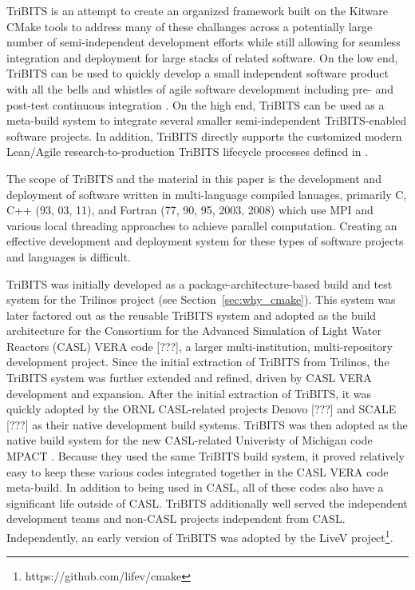 \documentclass[note]{TechNote}
\begin{document}
TriBITS is an attempt to create an organized framework built on the Kitware CMake tools to address many of these challanges across a potentially large number of semi-independent development efforts while still allowing for seamless integration and deployment for large stacks of related software.  On the low end, TriBITS can be used to quickly develop a small independent software product with all the bells and whistles of agile software development including pre- and post-test continuous integration \cite{XP2, ContinuousIntegration07}.  On the high end, TriBITS can be used as a meta-build system to integrate several smaller semi-independent TriBITS-enabled software projects.  In addition, TriBITS directly supports the customized modern Lean/Agile research-to-production TriBITS lifecycle processes defined in \cite{TribitsLifecycleModel, TribitsLifecycleModel_eScience2012}.

The scope of TriBITS and the material in this paper is the development and deployment of software written in multi-language compiled lanuages, primarily C, C++ (93, 03, 11), and Fortran (77, 90, 95, 2003, 2008) which use MPI and various local threading approaches to achieve parallel computation.  Creating an effective development and deployment system for these types of software projects and languages is difficult.

TriBITS was initially developed as a package-architecture-based build and test system for the Trilinos project (see Section~\ref{sec:why_cmake}).  This system was later factored out as the reusable TriBITS system and adopted as the build architecture for the Consortium for the Advanced Simulation of Light Water Reactors (CASL) VERA code [???], a larger multi-institution, multi-repository development project.  Since the initial extraction of TriBITS from Trilinos, the TriBITS system was further extended and refined, driven by CASL VERA development and expansion.   After the initial extraction of TriBITS, it was quickly adopted by the ORNL CASL-related projects Denovo [???] and SCALE [???] as their native development build systems.  TriBITS was then adopted as the native build system for the new CASL-related Univeristy of Michigan code MPACT \cite{MPACT}.  Because they used the same TriBITS build system, it proved relatively easy to keep these various codes integrated together in the CASL VERA code meta-build.  In addition to being used in CASL, all of these codes also have a significant life outside of CASL.  TriBITS additionally well served the independent development teams and non-CASL projects independent from CASL.  Independently, an early version of TriBITS was adopted by the LiveV project\footnote{https://github.com/lifev/cmake}.
\end{document}
